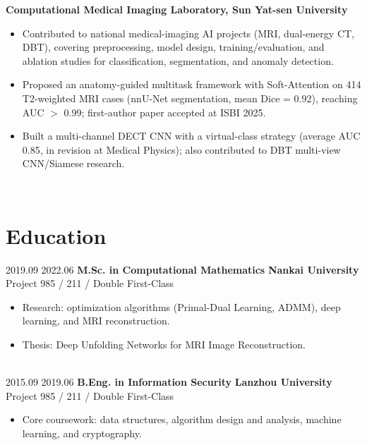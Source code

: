 \documentclass[letterpaper]{DS_class_file} %
\begin{document}
\begin{twenty}
		{\textbf{Computational Medical Imaging Laboratory, Sun Yat-sen University}}
		{}
		{\begin{itemize}
		\item Contributed to national medical-imaging AI projects (MRI, dual-energy CT, DBT), covering preprocessing, model design, training/evaluation, and ablation studies for classification, segmentation, and anomaly detection.
		\item Proposed an anatomy-guided multitask framework with Soft-Attention on 414 T2-weighted MRI cases (nnU-Net segmentation, mean Dice = 0.92), reaching AUC $>$ 0.99; first-author paper accepted at ISBI 2025.
		\item Built a multi-channel DECT CNN with a virtual-class strategy (average AUC 0.85, in revision at Medical Physics); also contributed to DBT multi-view CNN/Siamese research.
		\end{itemize}}
		\\[-0.35cm]
\end{twenty}


\section{Education}

\begin{twenty} %
	\twentyitem
	    {2019.09}
	    {2022.06}
	    {\textbf{M.Sc. in Computational Mathematics}}
	    {\textbf{Nankai University} \hspace{0.1cm} Project 985 / 211 / Double First-Class}
	    {}
	    {\begin{itemize}
			\item Research: optimization algorithms (Primal-Dual Learning, ADMM), deep learning, and MRI reconstruction.
			\item Thesis: Deep Unfolding Networks for MRI Image Reconstruction.
		\end{itemize}} 
	\\[-0.2cm]
   	\twentyitem
	    {2015.09}
	    {2019.06}
	    {\textbf{B.Eng. in Information Security}}
	    {\textbf{Lanzhou University} \hspace{0.1cm} Project 985 / 211 / Double First-Class}
	    {}
	    {\begin{itemize}
			\item Core coursework: data structures, algorithm design and analysis, machine learning, and cryptography.
		\end{itemize}} 
\end{twenty}
\end{document}
